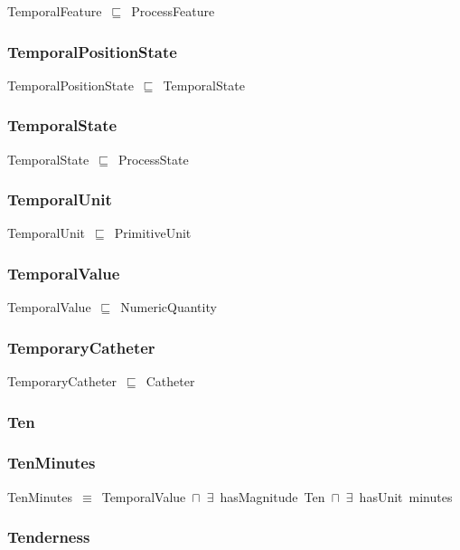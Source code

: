 \documentclass{article}
\begin{document}
TemporalFeature~\ensuremath{\sqsubseteq}~ProcessFeature~

\subsubsection*{TemporalPositionState}

TemporalPositionState~\ensuremath{\sqsubseteq}~TemporalState~

\subsubsection*{TemporalState}

TemporalState~\ensuremath{\sqsubseteq}~ProcessState~

\subsubsection*{TemporalUnit}

TemporalUnit~\ensuremath{\sqsubseteq}~PrimitiveUnit~

\subsubsection*{TemporalValue}

TemporalValue~\ensuremath{\sqsubseteq}~NumericQuantity~

\subsubsection*{TemporaryCatheter}

TemporaryCatheter~\ensuremath{\sqsubseteq}~Catheter~

\subsubsection*{Ten}

\subsubsection*{TenMinutes}

TenMinutes~\ensuremath{\equiv}~TemporalValue~\ensuremath{\sqcap}~\ensuremath{\exists}~hasMagnitude~Ten~\ensuremath{\sqcap}~\ensuremath{\exists}~hasUnit~minutes

\subsubsection*{Tenderness}
\end{document}
